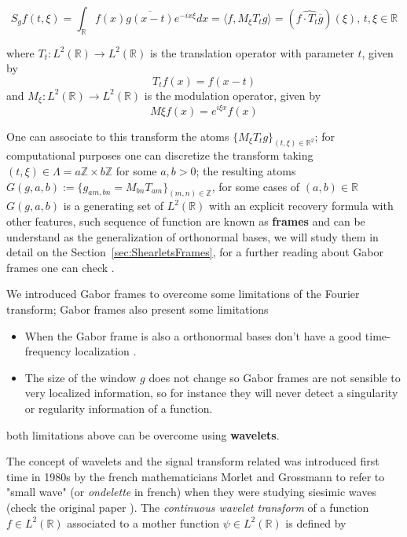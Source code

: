 $$
S_gf(t,\xi)=\int_{\mathbb{R}} f(x)\overline{g(x-t)}e^{-ix\xi}dx=\langle f,M_{\xi}T_tg\rangle = (\widehat{f\cdot T_t\overline{g}})(\xi)\text{,  } t,\xi\in\mathbb{R}
$$

where $T_t:L^2(\mathbb{R})\longrightarrow L^2(\mathbb{R})$ is the translation operator with parameter $t$, given by 
$$
T_tf(x)=f(x-t)
$$
and $M_{\xi}:L^2(\mathbb{R})\longrightarrow L^2(\mathbb{R})$ is the modulation operator, given by 
$$
M \xi f(x)=e^{i\xi x}f(x)
$$

\bigskip 

One can associate to this transform the atoms $\{M_{\xi}T_tg\}_{(t,\xi)\in\mathbb{R}^2}$; for computational purposes one can discretize the transform taking $(t,\xi)\in\Lambda=a\mathbb{Z}\times b\mathbb{Z}$ for some $a,b>0$; the resulting atoms $G(g,a,b):=\{g_{am,bn}=M_{bn}T_{am}\}_{(m,n)\in\mathbb{Z}}$, for some cases of $(a,b)\in\mathbb{R}$ $G(g,a,b)$ is a generating set of $L^2(\mathbb{R})$ with an explicit recovery formula with other features, such sequence of function are known as \textbf{frames} and can be understand as the generalization of orthonormal bases, we will study them in detail on the Section~\ref{sec:ShearletsFrames}, for a further reading about Gabor frames one can check \cite{Gabor}.

\bigskip

We introduced Gabor frames to overcome some limitations of the Fourier transform; Gabor frames also present some limitations
\begin{itemize}
\item When the Gabor frame is also a orthonormal bases don't have a good time-frequency localization \cite{Gabor}.
\item The size of the window $g$ does not change so Gabor frames are not sensible to very localized information, so for instance they will never detect a singularity or regularity information of a function.
\end{itemize} 
both limitations above can be overcome using \textbf{wavelets}.

\bigskip 

The concept of wavelets and the signal transform related was introduced first time 
in 1980s by the french mathematicians Morlet and Grossmann to refer to "small wave" (or \textit{ondelette} in french) when they were studying siesimic waves (check the original paper \cite{Grossman}). The \textit{continuous wavelet transform} of a function $f\in L^2(\mathbb{R})$ associated to a mother function $\psi\in L^2(\mathbb{R})$ is defined by 

